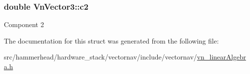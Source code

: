 \subsubsection[{\texorpdfstring{c2}{c2}}]{\setlength{\rightskip}{0pt plus 5cm}double Vn\+Vector3\+::c2}\hypertarget{structVnVector3_ad3debccb37ce62a08ce824f9bf487f3a}{}\label{structVnVector3_ad3debccb37ce62a08ce824f9bf487f3a}
Component 2 

The documentation for this struct was generated from the following file\+:\begin{DoxyCompactItemize}
\item 
src/hammerhead/hardware\+\_\+stack/vectornav/include/vectornav/\hyperlink{vn__linearAlgebra_8h}{vn\+\_\+linear\+Algebra.\+h}\end{DoxyCompactItemize}
